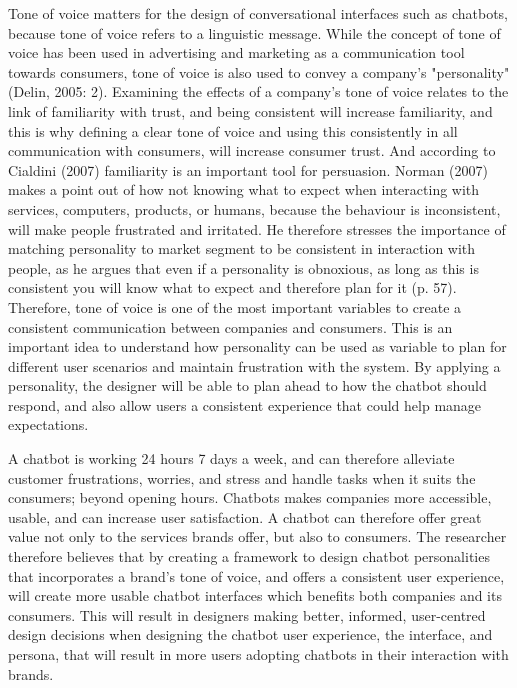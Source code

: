 Tone of voice matters for the design of conversational interfaces such as chatbots, because tone of voice refers to a linguistic message. While the concept of tone of voice has been used in advertising and marketing as a communication tool towards consumers, tone of voice is also used to convey a company's "personality" (Delin, 2005: 2). Examining the effects of a company's tone of voice relates to the link of familiarity with trust, and being consistent will increase familiarity, and this is why defining a clear tone of voice and using this consistently in all communication with consumers, will increase consumer trust. And according to Cialdini (2007) familiarity is an important tool for persuasion. Norman (2007) makes a point out of how not knowing what to expect when interacting with services, computers, products, or humans, because the behaviour is inconsistent, will make people frustrated and irritated. He therefore stresses the importance of matching personality to market segment to be consistent in interaction with people, as he argues that even if a personality is obnoxious, as long as this is consistent you will know what to expect and therefore plan for it (p. 57). Therefore, tone of voice is one of the most important variables to create a consistent communication between companies and consumers. This is an important idea to understand how personality can be used as variable to plan for different user scenarios and maintain frustration with the system. By applying a personality, the designer will be able to plan ahead to how the chatbot should respond, and also allow users a consistent experience that could help manage expectations.

A chatbot is working 24 hours 7 days a week, and can therefore alleviate customer frustrations, worries, and stress and handle tasks when it suits the consumers; beyond opening hours. Chatbots makes companies more accessible, usable, and can increase user satisfaction. A chatbot can therefore offer great value not only to the services brands offer, but also to consumers. The researcher therefore believes that by creating a framework to design chatbot personalities that incorporates a brand's tone of voice, and offers a consistent user experience, will create more usable chatbot interfaces which benefits both companies and its consumers. This will result in designers making better, informed, user-centred design decisions when designing the chatbot user experience, the interface, and persona, that will result in more users adopting chatbots in their interaction with brands.




